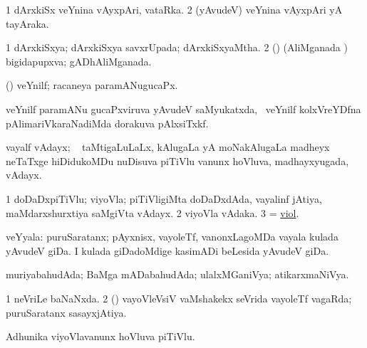 \bentry
{} 
\gl{\nA}
\expl{}
\bmng
\bnum
\num{1} dArxkiSx veYnina vAyxpAri, vataRka. 
\num{2} (yAvudeV) veYnina vAyxpAri yA tayAraka. 
\enum
\emng
\eentry

\bentry
{} 
\gl{\gu}
\expl{}
\bmng
\bnum
\num{1} dArxkiSxya; dArxkiSxya savxrUpada; dArxkiSxyaMtha. 
\num{2} (\rUpa) (AliMganada \vi) bigidapupxva; gADhAliMganada. 
\enum
\emng
\eentry

\bentry
{} 
\gl{\gu}
\expl{}
\bmng
 (\ravi) veYnilf;  racaneya paramANugucaPx. 
\emng
\eentry

\bentry
{} 
\gl{\nA}
\expl{}
\bmng
 veYnilf paramANu gucaPxviruva yAvudeV saMyukatxda, \kanmu\ veYnilf kolxVreYDfna pAlimariVkaraNadiMda dorakuva pAlxsiTxkf. 
\emng
\eentry

\bentry
{} 
\gl{\nA}
\expl{}
\bmng
 vayalf vAdayx; \sA\  taMtigaLuLaLx, kAlugaLa yA moNakAlugaLa madheyx neTaTxge hiDidukoMDu nuDisuva piTiVlu \mo vanunx hoVluva, \hfill\break madhayxyugada, vAdayx.  
\emng
\eentry

\bentry
{} 
\gl{\nA}
\expl{}
\bmng
\bnum
\num{1} doDaDxpiTiVlu; viyoVla; piTiVligiMta doDaDxdAda, vayalinf jAtiya, maMdarxshurxtiya saMgiVta vAdayx. 
\num{2} viyoVla vAdaka. 
\num{3} = \hyperlink{viol}{viol}. 
\enum
\emng
\eentry

\bentry
{} 
\gl{\nA}
\expl{}
\bmng
 veYyala: 
\banum
{} puruSaratanx; pAyxnisx, vayoleTf, \mo vanonxLagoMDa vayala kulada yAvudeV giDa. 
 I kulada giDadoMdige kasimADi beLesida yAvudeV giDa. 
\eanum
\emng
\eentry

\bentry
{} 
\gl{\gu}
\expl{}
\bmng
 muriyabahudAda; BaMga mADabahudAda; ulalxMGaniVya; atikarxmaNiVya. 
\emng
\eentry

\bentry
{} 
\gl{\gu}
\expl{}
\bmng
\bnum
\num{1} neVriLe baNaNxda. 
\num{2} (\savi) vayoVleVsiV vaMshakekx seVrida vayoleTf vagaRda; puruSaratanx sasayxjAtiya. 
\enum
\emng
\eentry

\bentry
{} 
\gl{\nA}
\expl{}
\bmng
 Adhunika viyoVlavanunx hoVluva piTiVlu. 
\emng
\eentry

